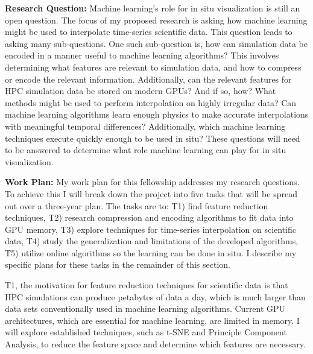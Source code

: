 \documentclass[12pt]{article}
\begin{document}
\textbf{Research Question:} Machine learning's role for in situ visualization is
still an open question.
%
The focus of my proposed research is asking how machine learning might be used
to interpolate time-series scientific data. This question leads to asking many
sub-questions.  One such sub-question is, how can simulation data be encoded in
a manner useful to machine learning algorithms?
%
This involves determining what features are relevant to simulation data, and how
to compress or encode the relevant information. Additionally, can the relevant
features for HPC simulation data be stored on modern GPUs? And if so, how?
%
What methods might be used to perform interpolation on highly irregular data?
Can machine learning algorithms learn enough physics to make accurate
interpolations with meaningful temporal differences? 
%
Additionally, which machine learning techniques execute quickly enough to be
used in situ? 
%
These questions will need to be answered to determine what role machine
learning can play for in situ visualization.


\textbf{Work Plan:} My work plan for this fellowship addresses my research
questions.  To achieve this I will break down the project into five tasks that
will be spread out over a three-year plan. The tasks are to: T1) find feature
reduction techniques, T2) research compression and encoding algorithms to fit
data into GPU memory, T3) explore techniques for time-series interpolation on
scientific data, T4) study the generalization and limitations of the developed
algorithms, T5) utilize online algorithms so the learning can be done in situ. I
describe my specific plans for these tasks in the remainder of this section.


T1, the motivation for feature reduction techniques for
scientific data is that HPC simulations can produce petabytes of data a
day, which is much larger than data sets conventionally used in machine learning
algorithms. Current GPU architectures, which are essential for machine learning,
are limited in memory. I will explore established techniques, such as
t-SNE and Principle Component Analysis, to reduce the feature space and
determine which features are necessary.
\end{document}

